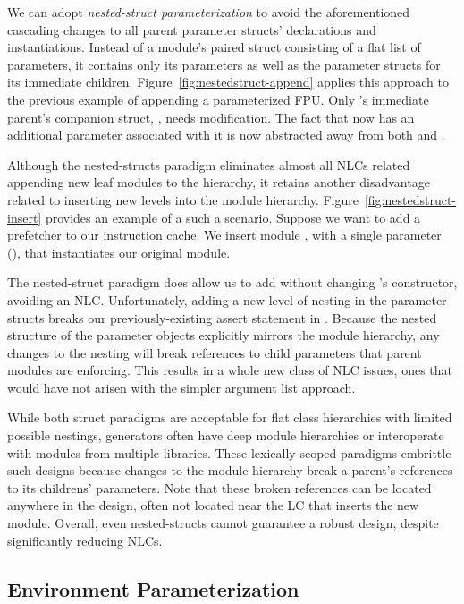 We can adopt \emph{nested-struct parameterization} to avoid the aforementioned cascading changes to all parent parameter structs' declarations and instantiations. 
Instead of a module's paired struct consisting of a flat list of parameters, it contains only its parameters as well as the parameter structs for its immediate children. 
Figure~\ref{fig:nestedstruct-append} applies this approach to the previous example of appending a parameterized FPU.
Only 's immediate parent's companion struct, , needs modification.
The fact that  now has an additional parameter associated with it is now abstracted away from both  and .

Although the nested-structs paradigm eliminates almost all NLCs related appending new leaf modules to the hierarchy,
it retains another disadvantage related to inserting new levels into the module hierarchy.
Figure~\ref{fig:nestedstruct-insert} provides an example of a such a scenario.
Suppose we want to add a prefetcher to our instruction cache. 
We insert module , with a single parameter (), that instantiates our original  module. 

The nested-struct paradigm does allow us to add  without changing 's constructor, avoiding an NLC.
Unfortunately, adding a new level of nesting in the parameter structs breaks our previously-existing assert statement in . 
Because the nested structure of the parameter objects explicitly mirrors the module hierarchy,
any changes to the nesting will break references to child parameters that parent modules are enforcing.
This results in a whole new class of NLC issues, ones that would have not arisen with the simpler argument list approach.

While both struct paradigms are acceptable for flat class hierarchies with limited possible nestings,
generators often have deep module hierarchies or interoperate with modules from multiple libraries. 
These lexically-scoped paradigms embrittle such designs because changes to the module hierarchy break a parent's references to its childrens' parameters. 
Note that these broken references can be located anywhere in the design, often not located near the LC that inserts the new module.
Overall, even nested-structs cannot guarantee a robust design, despite significantly reducing NLCs.


\subsection{Environment Parameterization}


